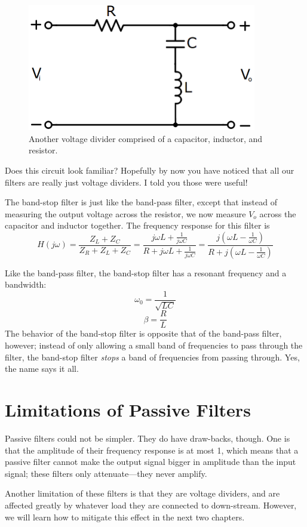 \begin{figure}[h!]
\centering
\includegraphics[width=10cm]{figures/BSfilter.png}
\caption{Another voltage divider comprised of a capacitor, inductor, and resistor.}
\label{RLC_BS}
\end{figure}
Does this circuit look familiar? Hopefully by now you have noticed that all our filters are really just voltage dividers. I told you those were useful!
\par
The band-stop filter is just like the band-pass filter, except that instead of measuring the output voltage across the resistor, we now measure $V_o$ across the capacitor and inductor together. The frequency response for this filter is
$$
H(j\omega) = \frac{Z_L+Z_C}{Z_R+Z_L+Z_C} = \frac{j\omega L+\frac{1}{j\omega C}}{R + j\omega L+\frac{1}{j\omega C}} = \frac{j\left(\omega L-\frac{1}{\omega C}\right)}{R + j\left(\omega L-\frac{1}{\omega C}\right)}
$$
\par
Like the band-pass filter, the band-stop filter has a resonant frequency and a bandwidth:
$$
\omega_0 = \frac{1}{\sqrt{LC}}
$$
$$
\beta = \frac{R}{L}
$$
The behavior of the band-stop filter is opposite that of the band-pass filter, however; instead of only allowing a small band of frequencies to pass through the filter, the band-stop filter \textit{stops} a band of frequencies from passing through. Yes, the name says it all.

\section{Limitations of Passive Filters}
Passive filters could not be simpler. They do have draw-backs, though. One is that the amplitude of their frequency response is at most 1, which means that a passive filter cannot make the output signal bigger in amplitude than the input signal; these filters only attenuate---they never amplify.
\par
Another limitation of these filters is that they are voltage dividers, and are affected greatly by whatever load they are connected to down-stream. However, we will learn how to mitigate this effect in the next two chapters. 
